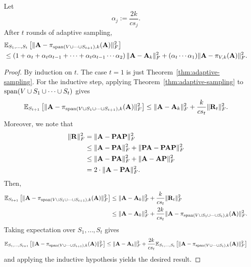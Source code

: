\documentclass{article}
\begin{document}
\begin{corollary}
Let 
\[\alpha_j := \frac{2k}{cs_j}.\]
After $t$ rounds of adaptive sampling, 
\begin{align*}
    &\mathbb{E}_{S_1,\ldots, S_{t}}\left[\|\mathbf{A} - \pi_{\operatorname*{span}(V\cup \cdots \cup S_{t+1}), k}(\mathbf{A})\|^2_F\right]\\&\leq \left(1 + \alpha_t + \alpha_t\alpha_{t-1}+ \cdots + \alpha_t\alpha_{t-1}\cdots\alpha_2\right)\|\mathbf{A} - \mathbf{A}_k\|^2_F + (\alpha_t\cdots \alpha_1)\|\mathbf{A} - \pi_{V, k}(\mathbf{A})\|^2_F.
\end{align*}
\end{corollary}
\begin{proof}
    By induction on $t$. The case $t=1$ is just Theorem~\ref{thm:adaptive-sampling}. For the inductive step, applying Theorem~\ref{thm:adaptive-sampling} to $\operatorname*{span}(V\cup S_1\cup\cdots\cup S_t)$ gives
    \[\mathbb{E}_{S_{t+1}}\left[\|\mathbf{A} - \pi_{\operatorname*{span}(V\cup S_1\cup \cdots \cup S_{t+1}), k}(\mathbf{A})\|^2_F\right]\leq \|\mathbf{A} - \mathbf{A}_k\|^2_F + \frac{k}{cs_t}\|\mathbf{R}_t\|^2_F.\]
    Moreover, we note that 
    \begin{align*}
        \|\mathbf{R}\|^2_F &= \|\mathbf{A} - \mathbf{P}\mathbf{A}\mathbf{P}\|^2_F\\
        &\leq\|\mathbf{A} - \mathbf{P}\mathbf{A}\|^2_F + \|\mathbf{P}\mathbf{A} - \mathbf{P}\mathbf{A}\mathbf{P}\|^2_F\\
        &\leq\|\mathbf{A} - \mathbf{P}\mathbf{A}\|^2_F + \|\mathbf{A} - \mathbf{A}\mathbf{P}\|^2_F\\
        &= 2\cdot \|\mathbf{A} - \mathbf{P}\mathbf{A}\|^2_F.
    \end{align*}
    Then, 
    \begin{align*}
        \mathbb{E}_{S_{t+1}}\left[\|\mathbf{A} - \pi_{\operatorname*{span}(V\cup S_1\cup \cdots \cup S_{t+1}), k}(\mathbf{A})\|^2_F\right]&\leq \|\mathbf{A} - \mathbf{A}_k\|^2_F + \frac{k}{cs_t}\|\mathbf{R}_t\|^2_F\\
        &\leq \|\mathbf{A} - \mathbf{A}_k\|^2_F + \frac{2k}{cs_t}\|\mathbf{A} - \pi_{\operatorname*{span}(V\cup S_1\cup \cdots \cup S_{t}), k}(\mathbf{A})\|^2_F.
    \end{align*}
    Taking expectation over $S_1,\ldots, S_t$ gives
    \[\mathbb{E}_{S_1,\ldots, S_{t+1}}\left[\|\mathbf{A} - \pi_{\operatorname*{span}(V\cup \cdots \cup S_{t+1}), k}(\mathbf{A})\|^2_F\right]\leq \|\mathbf{A} - \mathbf{A}_k\|^2_F + \frac{2k}{cs_t}\mathbb{E}_{S_1,\ldots, S_{t}}\left[\|\mathbf{A} - \pi_{\operatorname*{span}(V\cup \cdots \cup S_{t}), k}(\mathbf{A})\|^2_F\right]\]
    and applying the inductive hypothesis yields the desired result.
\end{proof}

\newpage


\end{document}
